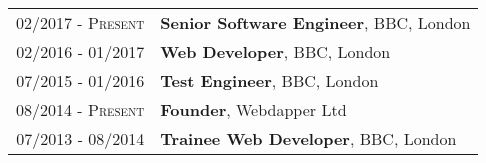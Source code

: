 \begin{tabular}{rp{11cm}}
\textsc{02/2017 - Present}
&
\textbf{Senior Software Engineer}, BBC, London
\\
\textsc{02/2016 - 01/2017}
&
\textbf{Web Developer}, BBC, London
\\
\textsc{07/2015 - 01/2016}
&
\textbf{Test Engineer}, BBC, London
\\
\textsc{08/2014 - Present}
&
\textbf{Founder}, Webdapper Ltd
\\
\textsc{07/2013 - 08/2014}
&
\textbf{Trainee Web Developer}, BBC, London

\end{tabular}
